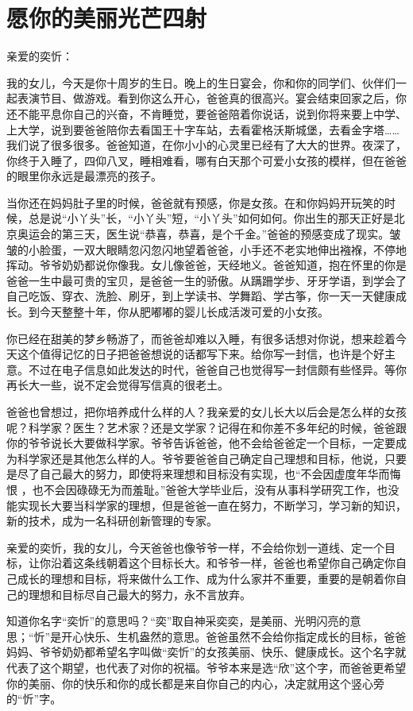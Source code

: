 \section{愿你的美丽光芒四射}

\noindent 亲爱的奕忻：

我的女儿，今天是你十周岁的生日。晚上的生日宴会，你和你的同学们、伙伴们一起表演节目、做游戏。看到你这么开心，爸爸真的很高兴。宴会结束回家之后，你还不能平息你自己的兴奋，不肯睡觉，要爸爸陪着你说话，说到你将来要上中学、上大学，说到要爸爸陪你去看国王十字车站，去看霍格沃斯城堡，去看金字塔……我们说了很多很多。爸爸知道，在你小小的心灵里已经有了大大的世界。夜深了，你终于入睡了，四仰八叉，睡相难看，哪有白天那个可爱小女孩的模样，但在爸爸的眼里你永远是最漂亮的孩子。

当你还在妈妈肚子里的时候，爸爸就有预感，你是女孩。在和你妈妈开玩笑的时候，总是说“小丫头”长，“小丫头”短，“小丫头”如何如何。你出生的那天正好是北京奥运会的第三天，医生说“恭喜，恭喜，是个千金。”爸爸的预感变成了现实。皱皱的小脸蛋，一双大眼睛忽闪忽闪地望着爸爸，小手还不老实地伸出襁褓，不停地挥动。爷爷奶奶都说你像我。女儿像爸爸，天经地义。爸爸知道，抱在怀里的你是爸爸一生中最可贵的宝贝，是爸爸一生的骄傲。从蹒跚学步、牙牙学语，到学会了自己吃饭、穿衣、洗脸、刷牙，到上学读书、学舞蹈、学古筝，你一天一天健康成长。到今天整整十年，你从肥嘟嘟的婴儿长成活泼可爱的小女孩。

你已经在甜美的梦乡畅游了，而爸爸却难以入睡，有很多话想对你说，想来趁着今天这个值得记忆的日子把爸爸想说的话都写下来。给你写一封信，也许是个好主意。不过在电子信息如此发达的时代，爸爸自己也觉得写一封信颇有些怪异。等你再长大一些，说不定会觉得写信真的很老土。

爸爸也曾想过，把你培养成什么样的人？我亲爱的女儿长大以后会是怎么样的女孩呢？科学家？医生？艺术家？还是文学家？记得在和你差不多年纪的时候，爸爸跟你的爷爷说长大要做科学家。爷爷告诉爸爸，他不会给爸爸定一个目标，一定要成为科学家还是其他怎么样的人。爷爷要爸爸自己确定自己理想和目标，他说，只要是尽了自己最大的努力，即使将来理想和目标没有实现，也“不会因虚度年华而悔恨 ，也不会因碌碌无为而羞耻。”爸爸大学毕业后，没有从事科学研究工作，也没能实现长大要当科学家的理想，但是爸爸一直在努力，不断学习，学习新的知识，新的技术，成为一名科研创新管理的专家。

亲爱的奕忻，我的女儿，今天爸爸也像爷爷一样，不会给你划一道线、定一个目标，让你沿着这条线朝着这个目标长大。和爷爷一样，爸爸也希望你自己确定你自己成长的理想和目标，将来做什么工作、成为什么家并不重要，重要的是朝着你自己的理想和目标尽自己最大的努力，永不言放弃。

知道你名字“奕忻”的意思吗？“奕”取自神采奕奕，是美丽、光明闪亮的意思；“忻”是开心快乐、生机盎然的意思。爸爸虽然不会给你指定成长的目标，爸爸妈妈、爷爷奶奶都希望名字叫做“奕忻”的女孩美丽、快乐、健康成长。这个名字就代表了这个期望，也代表了对你的祝福。爷爷本来是选“欣”这个字，而爸爸更希望你的美丽、你的快乐和你的成长都是来自你自己的内心，决定就用这个竖心旁的“忻”字。

